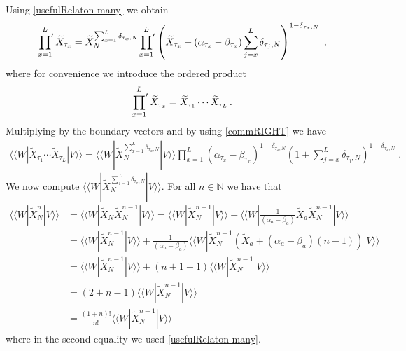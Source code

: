 \documentclass[10pt]{article}
\numberwithin{equation}{section}
\numberwithin{equation}{subsection}
\newcommand{\co}{\;,}
\newcommand{\dt}{\;.}
\begin{document}
Using \eqref{usefulRelaton-many} we obtain
\begin{equation}
	\sideset{}{'}\prod_{x=1}^L\widetilde{X}_{\tau_{x}}=\widetilde{X}_{N}^{\sum_{x=1}^{L}\delta_{\tau_{x},N}}\sideset{}{'}\prod_{x=1}^L\left(\widetilde{X}_{\tau_{x}}+(\alpha_{\tau_{x}}-\beta_{\tau_{x}})\sum_{j=x}^{L}\delta_{\tau_{j},N}\right)^{1-\delta_{\tau_{x},N}}\co
\end{equation}
where for convenience we introduce the ordered product
\begin{equation}
 \sideset{}{'}\prod_{x=1}^L \widetilde{X}_{\tau_{x}}= \widetilde{X}_{\tau_{1}}\cdots  \widetilde{X}_{\tau_{L}}\,.
\end{equation} 
Multiplying by the boundary vectors and by using \eqref{commRIGHT} we have 
\begin{align}
	 \langle \langle W| \widetilde{X}_{\tau_{1}}\cdots  \widetilde{X}_{\tau_{L}}
	|V \rangle\rangle=\langle \langle W|  \widetilde{X}_{N}^{\sum_{x=1}^{L}\delta_{\tau_{x},N}} |V\rangle\rangle
	\prod_{x=1}^{L}\left(\alpha_{\tau_{x}}-\beta_{\tau_{x}}\right)^{1-\delta_{\tau_{x},N}}\left(1+\sum_{j=x}^{L}\delta_{\tau_{j},N}\right)^{1-\delta_{\tau_{x},N}}   \dt
\end{align}
We now compute $ \langle \langle W|  \widetilde{X}_{N}^{\sum_{i=1}^{L}\delta_{\tau_{x},N}} |V\rangle\rangle $. For all $n\in \mathbb{N}$ we have that  
\begin{align}
	 \langle \langle W|  \widetilde{X}_{N}^{n} |V\rangle\rangle &= \langle \langle W|  \widetilde{X}_{N}\widetilde{X}_{N}^{n-1} |V\rangle\rangle = \langle \langle W|  \widetilde{X}_{N}^{n-1} |V\rangle\rangle  + \langle \langle W|  \frac{1}{(\alpha_{a}-\beta_{a})}\widetilde{X}_{a}\widetilde{X}_{N}^{n-1} |V\rangle\rangle \nonumber
	\\&=
	 \langle \langle W|  \widetilde{X}_{N}^{n-1} |V\rangle\rangle +\frac{1}{(\alpha_{a}-\beta_{a})} \langle \langle W|  \widetilde{X}_{N}^{n-1}\left(\widetilde{X}_{a}+(\alpha_{a}-\beta_{a})(n-1)\right) |V\rangle\rangle \nonumber
	\\&=
	 \langle \langle W|  \widetilde{X}_{N}^{n-1} |V\rangle\rangle +\left(n+1-1\right) \langle \langle W|  \widetilde{X}_{N}^{n-1} |V\rangle\rangle \nonumber
	\\&=
	\left(2+n-1\right) \langle \langle W|  \widetilde{X}_{N}^{n-1} |V\rangle\rangle \nonumber
	\\&=
	\frac{(1+n)!}{n!} \langle \langle W|  \widetilde{X}_{N}^{n-1} |V\rangle\rangle 
\end{align}
where in the second equality we used \eqref{usefulRelaton-many}. 
\end{document}
